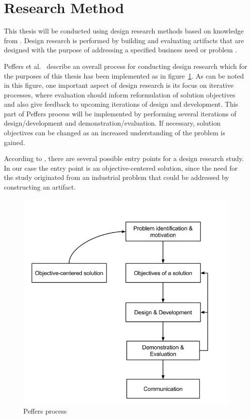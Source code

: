 \section{Research Method}
This thesis will be conducted using design research methods based on knowledge from \cite{DS, Peffers, DesignEval}. Design research is performed by building and evaluating artifacts that are designed with the purpose of addressing a specified business need or problem \cite{DS}. 

Peffers et al.\ \cite{Peffers} describe an overall process for conducting design research which for the purposes of this thesis has been implemented as in figure~\ref{fig:peffer}. As can be noted in this figure, one important aspect of design research is its focus on iterative processes, where evaluation should inform reformulation of solution objectives and also give feedback to upcoming iterations of design and development. This part of Peffers process will be implemented by performing several iterations of design/development and demonstration/evaluation. If necessary, solution objectives can be changed as an increased understanding of the problem is gained. 

According to \cite{Peffers}, there are several possible entry points for a design research study. In our case the entry point is an objective-centered solution, since the need for the study originated from an industrial problem that could be addressed by constructing an artifact.
\begin{figure}[h!]
\centering
\includegraphics[width=0.7\pdfpagewidth]{figure/Peffer.png}
\caption{Peffers process}
\label{fig:peffer}
\end{figure}

